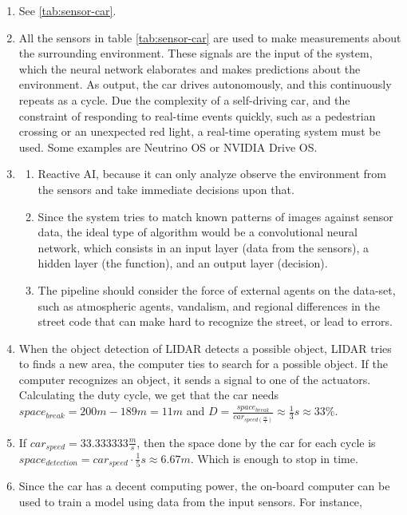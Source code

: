 \documentclass[acmsmall, screen,timestamp,nonacm]{acmart}
\begin{document}
\begin{enumerate}
    \item See \ref{tab:sensor-car}.
	\item All the sensors in table \ref{tab:sensor-car} are used to make measurements about 
		the surrounding environment. These signals are the input of the system,
		which the neural network elaborates and makes predictions about the
		environment. As output, the car drives autonomously, and this
		continuously repeats as a cycle.
		Due the complexity of a self-driving car, and the constraint
		of responding to real-time events quickly, such as a pedestrian crossing
		or an unexpected red light,
		a real-time operating system must be used. Some examples are Neutrino
		OS or NVIDIA Drive OS. 
	\item 
		\begin{enumerate}
			\item Reactive AI, because it can only analyze observe the
				environment from the sensors and take immediate decisions upon
				that.
			\item Since the system tries to match known patterns of
				images against sensor data, the ideal type of algorithm would be
				a convolutional neural network, which consists in an input layer
				(data from the sensors), a hidden layer (the function), and an
				output layer (decision). 
			\item The pipeline should consider the force of external agents on
				the data-set, such as atmospheric agents, vandalism, and
				regional differences in the street code that can make hard
				to recognize the street, or lead to errors. 
		\end{enumerate}
	\item When the object detection of LIDAR detects a possible object,
		LIDAR tries to  finds a new area, the computer ties to search
		for a possible object. If the computer recognizes an object, it
		sends a signal to one of the actuators. Calculating the duty cycle, we
		get that the car needs  $space_{break} = 200m - 189m = 11m$ and $D =
		\frac{space_{break}}{car_{speed(\frac{m}{s})}} \approx \frac{1}{3} s
		\approx 33\%$.
	\item If $car_{speed} = 33.333333 \frac{m}{s}$, then the space done by
		the car for each cycle is $space_{detection} = car_{speed}
		\cdot \frac{1}{5} s \approx 6.67 m $. Which is enough to stop in time.
	\item Since the car has a decent computing power, the on-board computer can be 
		used to train a model using data from the input sensors. For instance,

\end{enumerate}
\end{document}
